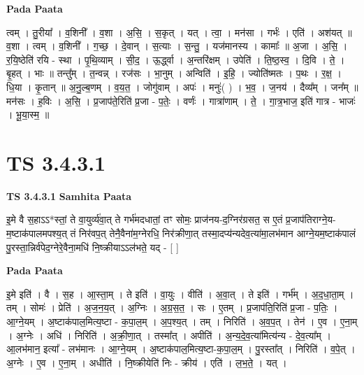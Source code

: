 \documentclass[17pt]{extarticle}
\begin{document}
\textbf{Pada Paata} \newline

त्वम् । तु॒रीया᳚ । व॒शिनी᳚ । व॒शा । अ॒सि॒ । स॒कृत् । यत् । त्वा॒ । मन॑सा । गर्भः॑ । एति॑ । अश॑यत् ॥ व॒शा । त्वम् । व॒शिनी᳚ । ग॒च्छ॒ । दे॒वान् । स॒त्याः । स॒न्तु॒ । यज॑मानस्य । कामाः᳚ ॥ अ॒जा । अ॒सि॒ । र॒यि॒ष्ठेति॑ रयि - स्था । पृ॒थि॒व्याम् । सी॒द॒ । ऊ॒र्द्ध्वा । अ॒न्तरि॑क्षम् । उपेति॑ । ति॒ष्ठ॒स्व॒ । दि॒वि । ते॒ । बृ॒हत् । भाः ॥ तन्तु᳚म् । त॒न्वन्न् । रज॑सः । भा॒नुम् । अन्विति॑ । इ॒हि॒ । ज्योति॑ष्मतः । प॒थः । र॒क्ष॒ । धि॒या । कृ॒तान् ॥ अ॒नु॒ल्ब॒णम् । व॒य॒त॒ । जोगु॑वाम् । अपः॑ । मनुः॑( ) । भ॒व॒ । ज॒नय॑ । दैव्य᳚म् । जन᳚म् ॥ मन॑सः । ह॒विः । अ॒सि॒ । प्र॒जाप॑ते॒रिति॑ प्र॒जा - प॒तेः॒ । वर्णः॑ । गात्रा॑णाम् । ते॒ । गा॒त्र॒भाज॒ इति॑ गात्र - भाजः॑ । भू॒या॒स्म॒ ॥  \newline





\section{ TS 3.4.3.1 }

\textbf{TS 3.4.3.1 } \newline
\textbf{Samhita Paata} \newline

इ॒मे वै स॒हाऽऽ*स्तां॒ ते वा॒युर्व्य॑वा॒त् ते गर्भ॑मदधातां॒ तꣳ सोमः॒ प्राज॑नय-द॒ग्निर॑ग्रसत॒ स ए॒तं प्र॒जाप॑तिराग्ने॒य-म॒ष्टाक॑पालमपश्य॒त् तं निर॑वप॒त् तेनै॒वैना॑म॒ग्नेरधि॒ निर॑क्रीणा॒त् तस्मा॒दप्य॑न्यदेव॒त्या॑मा॒लभ॑मान आग्ने॒यम॒ष्टाक॑पालं पु॒रस्ता॒न्निर्व॑पेद॒ग्नेरे॒वैना॒मधि॑ नि॒ष्क्रीयाऽऽल॑भते॒ यद् - [  ] \newline

\textbf{Pada Paata} \newline

इ॒मे इति॑ । वै । स॒ह । आ॒स्ता॒म् । ते इति॑ । वा॒युः । वीति॑ । अ॒वा॒त् । ते इति॑ । गर्भ᳚म् । अ॒द॒धा॒ता॒म् । तम् । सोमः॑ । प्रेति॑ । अ॒ज॒न॒य॒त् । अ॒ग्निः । अ॒ग्र॒स॒त॒ । सः । ए॒तम् । प्र॒जाप॑ति॒रिति॑ प्र॒जा - प॒तिः॒ । आ॒ग्ने॒यम् । अ॒ष्टाक॑पाल॒मित्य॒ष्टा - क॒पा॒ल॒म् । अ॒प॒श्य॒त् । तम् । निरिति॑ । अ॒व॒प॒त् । तेन॑ । ए॒व । ए॒ना॒म् । अ॒ग्नेः । अधि॑ । निरिति॑ । अ॒क्री॒णा॒त् । तस्मा᳚त् । अपीति॑ । अ॒न्य॒दे॒व॒त्या॑मित्य॑न्य - दे॒व॒त्या᳚म् । आ॒लभ॑मान॒ इत्या᳚ - लभ॑मानः । आ॒ग्ने॒यम् । अ॒ष्टाक॑पाल॒मित्य॒ष्टा-क॒पा॒ल॒म् । पु॒रस्ता᳚त् । निरिति॑ । व॒पे॒त् । अ॒ग्नेः । ए॒व । ए॒ना॒म् । अधीति॑ । नि॒ष्क्रीयेति॑ निः - क्रीय॑ । एति॑ । ल॒भ॒ते॒ । यत् ।  \newline
\end{document}
